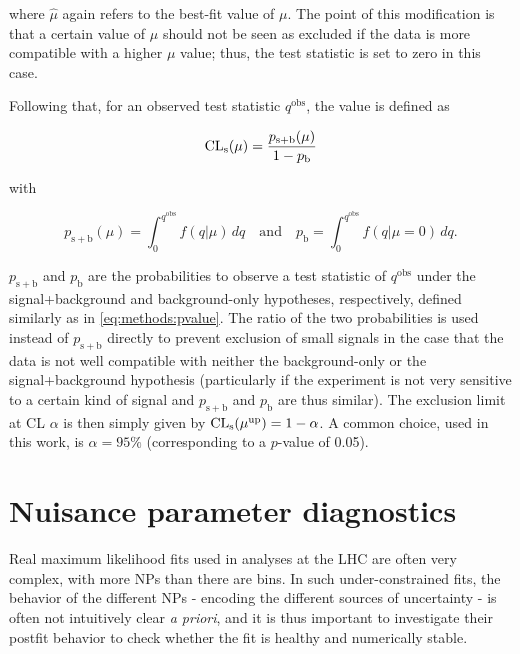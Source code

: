 \noindent where $\hat{\mu}$ again refers to the best-fit value of $\mu$. The point of this modification is that a certain value of $\mu$ should not be seen as excluded if the data is more compatible with a higher $\mu$ value; thus, the test statistic is set to zero in this case.

Following that, for an observed test statistic $q^{\mathrm{obs}}$, the \CLs value is defined as

\begin{equation}
\label{eq:methods:cls}
    \mathrm{CL}_{\mathrm{s}} (\mu) = \frac { p_{\mathrm{s+b}} (\mu) } { 1 - p_{\mathrm{b}} }
\end{equation}

\noindent with

\begin{equation}
    p_{\mathrm{s+b}} (\mu) = \int_0^{q^{\mathrm{obs}}} f(q | \mu) \, dq
    \quad \text{and} \quad
    p_{\mathrm{b}} = \int_0^{q^{\mathrm{obs}}} f(q | \mu = 0) \, dq.
\end{equation}

$p_{\mathrm{s+b}}$ and $p_{\mathrm{b}}$ are the probabilities to observe a test statistic of $q^{\mathrm{obs}}$ under the signal+background and background-only hypotheses, respectively, defined similarly as in \cref{eq:methods:pvalue}. The ratio of the two probabilities is used instead of $p_{\mathrm{s+b}}$ directly to prevent exclusion of small signals in the case that the data is not well compatible with neither the background-only or the signal+background hypothesis (particularly if the experiment is not very sensitive to a certain kind of signal and $p_{\mathrm{s+b}}$ and $p_{\mathrm{b}}$ are thus similar). The exclusion limit at CL $\alpha$ is then simply given by $\mathrm{CL}_{\mathrm{s}} (\mu^{\mathrm{up}}) = 1 - \alpha$. A common choice, used in this work, is $\alpha = 95\%$ (corresponding to a $p$-value of 0.05).

\section{Nuisance parameter diagnostics}
\label{sec:stat:nps}

Real maximum likelihood fits used in analyses at the LHC are often very complex, with more NPs than there are bins. In such under-constrained fits, the behavior of the different NPs - encoding the different sources of uncertainty - is often not intuitively clear \textit{a priori}, and it is thus important to investigate their postfit behavior to check whether the fit is healthy and numerically stable.

